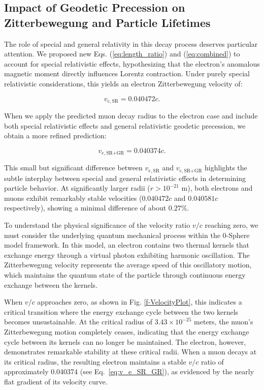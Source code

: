 \documentclass[%
 reprint,
 amsmath,amssymb,
 aps,
]{revtex4-1}
\numberwithin{equation}{section}%
\begin{document}
\subsection{Impact of Geodetic Precession on Zitterbewegung and Particle Lifetimes}
\label{sec:ImpactOfGeodetic}

The role of special and general relativity in this decay process deserves particular attention. We proposed new Eqs. (\ref{eq:length_ratio}) and (\ref{eq:combined}) to account for special relativistic effects, hypothesizing that the electron's anomalous magnetic moment directly influences Lorentz contraction. Under purely special relativistic considerations, this yields an electron Zitterbewegung velocity of:

\begin{equation}
v_{e,\text{SR}} = 0.040472c.
\label{eq:v_e_SR}
\end{equation}

When we apply the predicted muon decay radius to the electron case and include both special relativistic effects and general relativistic geodetic precession, we obtain a more refined prediction:

\begin{equation}
v_{e,\text{SR+GR}} = 0.040374c.
\label{eq:v_e_SR_GR}
\end{equation}

This small but significant difference between $v_{e,\text{SR}}$ and $v_{e,\text{SR+GR}}$ highlights the subtle interplay between special and general relativistic effects in determining particle behavior. At significantly larger radii ($r > 10^{-21}$ m), both electrons and muons exhibit remarkably stable velocities ($0.040472c$ and $0.040581c$ respectively), showing a minimal difference of about $0.27\%$.

To understand the physical significance of the velocity ratio $v/c$ reaching zero, we must consider the underlying quantum mechanical process within the 0-Sphere model framework. In this model, an electron contains two thermal kernels that exchange energy through a virtual photon exhibiting harmonic oscillation. The Zitterbewegung velocity represents the average speed of this oscillatory motion, which maintains the quantum state of the particle through continuous energy exchange between the kernels.

When $v/c$ approaches zero, as shown in Fig. \ref{f-VelocityPlot}, this indicates a critical transition where the energy exchange cycle between the two kernels becomes unsustainable. At the critical radius of $3.43 \times 10^{-25}$ meters, the muon's Zitterbewegung motion completely ceases, indicating that the energy exchange cycle between its kernels can no longer be maintained. The electron, however, demonstrates remarkable stability at these critical radii. When a muon decays at its critical radius, the resulting electron maintains a stable $v/c$ ratio of approximately 0.040374 (see Eq.~\ref{eq:v_e_SR_GR}), as evidenced by the nearly flat gradient of its velocity curve.
\end{document}
